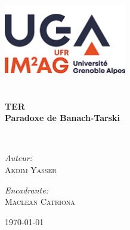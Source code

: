 \begin{titlepage}
\begin{center}

\includegraphics[width=0.4\textwidth]{./images/UFR_IM2AG_2020.jpg}~\\[1cm]


\textsc{\Large }\\[1cm]

\HRule \\[0.8cm]

{\huge \bfseries TER\\
Paradoxe de Banach-Tarski \\[0.8cm] }

\HRule \\[1.5cm]

\begin{minipage}{0.4\textwidth}
\begin{flushleft} \large
\emph{Auteur:}\\
\textsc{Akdim Yasser}\\

\end{flushleft}
\end{minipage}
\begin{minipage}{0.4\textwidth}
\begin{flushright} \large
\emph{Encadrante:} \\
\textsc{Maclean Catriona}\\

\end{flushright}
\end{minipage}

\vfill

{\large \today}

\end{center}
\end{titlepage}
